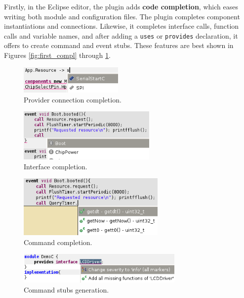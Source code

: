 Firstly, in the Eclipse editor, the plugin adds {\bf code completion}, which eases writing both module and configuration files. The plugin completes component instantiations and connections. Likewise, it completes interface calls, function calls and variable names, and after adding a \texttt{uses} or \texttt{provides} declaration, it offers to create command and event stubs. These features are best shown in Figures \ref{fig:first_compl} through
\ref{fig:last_compl}.

\begin{figure}[h]
  \centering
  \includegraphics[width=0.45\textwidth]{img/eclipse_compl3.png}
  \caption{Provider connection completion.}
\end{figure}

\begin{figure}[h]
  \centering
  \includegraphics[width=0.6\textwidth]{img/eclipse_compl4.png}
  \caption{Interface completion.}
\end{figure}

\begin{figure}[h]
  \centering
  \includegraphics[width=0.64\textwidth]{img/eclipse_compl5.png}
  \caption{Command completion.}
\end{figure}

\begin{figure}[h]
  \centering
  \includegraphics[width=0.72\textwidth]{img/eclipse_compl6.png}
  \caption{Command stubs generation.}
  \label{fig:last_compl}
\end{figure}

